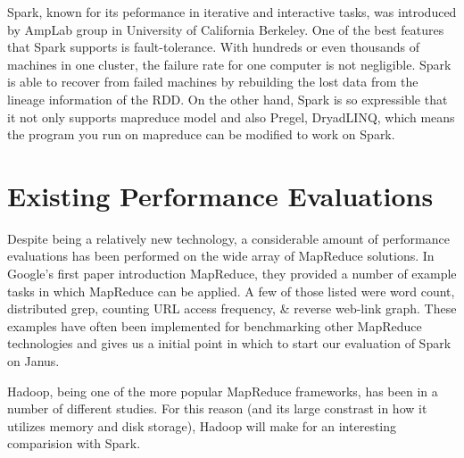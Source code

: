 \documentclass{article}
\begin{document}

Spark\citep{zaharia_rdd}, known for its peformance in iterative and interactive tasks, was introduced by AmpLab group in University of California Berkeley. One of the best features that Spark supports is fault-tolerance. With hundreds or even thousands of machines in one cluster, the failure rate for one computer is not negligible. Spark is able to recover from failed machines by rebuilding the lost data from the lineage information of the RDD. On the other hand, Spark is so expressible that it not only supports mapreduce model and also Pregel, DryadLINQ, which means the program you run on mapreduce can be modified to work on Spark.

\section*{Existing Performance Evaluations }
Despite being a relatively new technology, a considerable amount of performance
evaluations has been performed on the wide array of MapReduce solutions.
In Google's first paper introduction MapReduce, they provided a number of
example tasks in which MapReduce can be applied. A few of those listed were
word count, distributed grep, counting URL access frequency, \& reverse web-link
graph\citep{dean-mapreduce}. These examples have often been implemented for
benchmarking other MapReduce technologies and gives us a initial point in which
to start our evaluation of Spark on Janus.

Hadoop, being one of the more popular MapReduce frameworks, has been in a
number of different studies. For this reason (and its large constrast in how
it utilizes memory and disk storage), Hadoop will make for an interesting
comparision with Spark.
\end{document}
